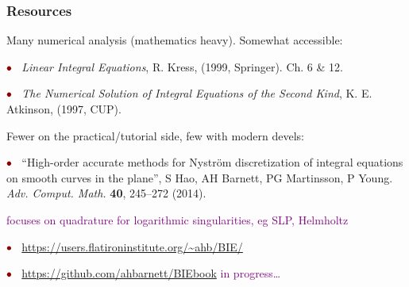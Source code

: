 \documentclass[t]{beamer}
\newcommand{\ft}[1]{\frametitle{#1}}
\newcommand{\com}[1]{{\scriptsize \textcolor{purple}{#1}}}      %
\newcommand{\sg}{\vspace{1ex}}
\newcommand{\hg}{\vspace{0.5ex}}
\newcommand{\rb}{\ensuremath{\textcolor{darkred}{\bullet\;}}\ }
\begin{document}
\begin{frame}\ft{Resources}  %

Many numerical analysis (mathematics heavy). Somewhat accessible:

\hg

\rb {\em Linear Integral Equations}, R. Kress, (1999, Springer). Ch. 6 \& 12.

\hg

\rb {\em The Numerical Solution of Integral Equations of the Second Kind},
K. E. Atkinson, (1997, CUP).




\sg

Fewer on the practical/tutorial side, few with modern devels:

\hg

\rb ``High-order accurate methods for Nystr\"om discretization of integral equations on smooth curves in the plane'', S Hao, AH Barnett, PG Martinsson, P Young.
{\em Adv. Comput. Math.} {\bf 40}, 245--272 (2014).

\hfill \com{focuses on quadrature for logarithmic singularities,
  eg SLP, Helmholtz}

\hg

\rb \url{https://users.flatironinstitute.org/~ahb/BIE/}

\hg

\rb \url{https://github.com/ahbarnett/BIEbook} \hfill \com{in progress\dots}

\end{frame}
\end{document}
